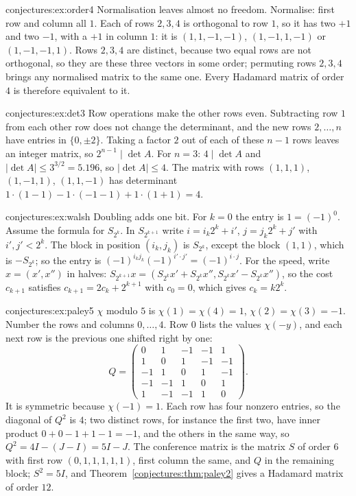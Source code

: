 \begin{solution}{conjectures:ex:order4}
\idea Normalisation leaves almost no freedom.
\writeup Normalise: first row and column all $1$. Each of rows $2,3,4$ is orthogonal to row $1$, so it has two $+1$ and two $-1$, with a $+1$ in column
$1$: it is $(1,1,-1,-1)$, $(1,-1,1,-1)$ or $(1,-1,-1,1)$. Rows $2,3,4$ are distinct, because two equal rows are not orthogonal, so they are these three
vectors in some order; permuting rows $2,3,4$ brings any normalised matrix to the same one. Every Hadamard matrix of order $4$ is therefore equivalent to
it.
\end{solution}

\begin{solution}{conjectures:ex:det3}
\idea Row operations make the other rows even.
\writeup Subtracting row $1$ from each other row does not change the determinant, and the new rows $2,\dots,n$ have entries in $\{0,\pm2\}$. Taking
a factor $2$ out of each of these $n-1$ rows leaves an integer matrix, so $2^{n-1}\mid\det A$. For $n=3$: $4\mid\det A$ and
$|\det A|\le3^{3/2}=5.196$, so $|\det A|\le4$. The matrix with rows $(1,1,1)$, $(1,-1,1)$, $(1,1,-1)$ has determinant
$1\cdot(1-1)-1\cdot(-1-1)+1\cdot(1+1)=4$.
\end{solution}

\begin{solution}{conjectures:ex:walsh}
\idea Doubling adds one bit.
\writeup For $k=0$ the entry is $1=(-1)^0$. Assume the formula for $S_{2^k}$. In $S_{2^{k+1}}$ write $i=i_k2^k+i'$, $j=j_k2^k+j'$ with $i',j'<2^k$. The
block in position $(i_k,j_k)$ is $S_{2^k}$, except the block $(1,1)$, which is $-S_{2^k}$; so the entry is $(-1)^{i_kj_k}(-1)^{i'\cdot j'}=(-1)^{i\cdot j}$.
For the speed, write $x=(x',x'')$ in halves: $S_{2^{k+1}}x=(S_{2^k}x'+S_{2^k}x'',S_{2^k}x'-S_{2^k}x'')$, so the cost $c_{k+1}$ satisfies
$c_{k+1}=2c_k+2^{k+1}$ with $c_0=0$, which gives $c_k=k2^k$.
\end{solution}

\begin{solution}{conjectures:ex:paley5}
\idea $\chi$ modulo $5$ is $\chi(1)=\chi(4)=1$, $\chi(2)=\chi(3)=-1$.
\writeup Number the rows and columns $0,\dots,4$. Row $0$ lists the values $\chi(-y)$, and each next row is the previous one shifted right by one:
\[
Q=\begin{pmatrix}0&1&-1&-1&1\\1&0&1&-1&-1\\-1&1&0&1&-1\\-1&-1&1&0&1\\1&-1&-1&1&0\end{pmatrix}.
\]
It is symmetric because $\chi(-1)=1$. Each row has four nonzero entries, so the diagonal of $Q^2$ is $4$; two distinct rows, for instance the first two, have inner product
$0+0-1+1-1=-1$, and the others in the same way, so $Q^2=4I-(J-I)=5I-J$. The conference matrix is the matrix $S$ of order $6$ with first row
$(0,1,1,1,1,1)$, first column the same, and $Q$ in the remaining block; $S^2=5I$, and Theorem~\ref{conjectures:thm:paley2} gives a Hadamard matrix of order $12$.
\end{solution}

